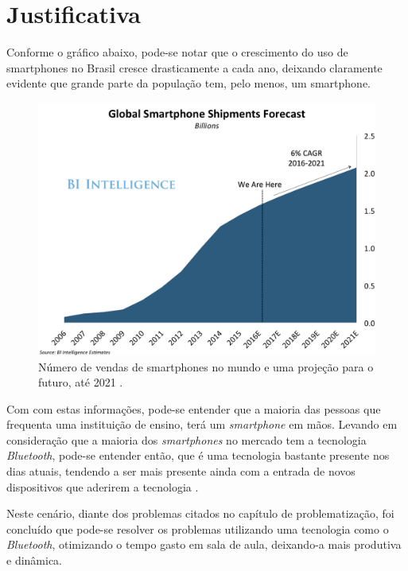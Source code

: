 \documentclass[
	12pt,
	oneside,
	a4paper,
	english,
	brazil,
]{abntex2}
\begin{document}
\chapter{Justificativa}

Conforme o gráfico abaixo, pode-se notar que o crescimento do uso de smartphones no Brasil cresce drasticamente a cada ano, deixando claramente evidente que grande parte da população tem, pelo menos, um smartphone.

\begin{figure}[h]
\centering
\includegraphics[width=1.0\textwidth]{smartphone_sales}
    \caption{
        Número de vendas de smartphones no mundo e uma projeção para o futuro, até 2021 \cite{smartphone-numbers-image}.
    }
\end{figure}

Com com estas informações, pode-se entender que a maioria das pessoas que frequenta uma instituição de ensino, terá um \emph{smartphone} em mãos. Levando em consideração que a maioria dos \emph{smartphones} no mercado tem a tecnologia \emph{Bluetooth}, pode-se entender então, que é uma tecnologia bastante presente nos dias atuais, tendendo a ser mais presente ainda com a entrada de novos dispositivos que aderirem a tecnologia \cite{bluetooth-devices}.

Neste cenário, diante dos problemas citados no capítulo de problematização, foi concluído que pode-se resolver os problemas utilizando uma tecnologia como o \emph{Bluetooth}, otimizando o tempo gasto em sala de aula, deixando-a mais produtiva e dinâmica.


\end{document}
